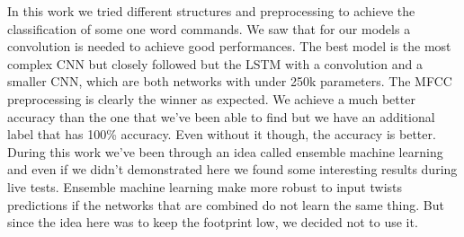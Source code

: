In this work we tried different structures and preprocessing to achieve the classification of some one word commands. We saw that for our models a convolution is needed to achieve good performances. The best model is the most complex CNN but closely followed but the LSTM with a convolution and a smaller CNN, which are both networks with under 250k parameters. The MFCC preprocessing is clearly the winner as expected. We achieve a much better accuracy than the one that we've been able to find but we have an additional label that has 100\% accuracy. Even without it though, the accuracy is better. During this work we've been through an idea called ensemble machine learning and even if we didn't demonstrated here we found some interesting results during live tests. Ensemble machine learning make more robust to input twists predictions if the networks that are combined do not learn the same thing. But since the idea here was to keep the footprint low, we decided not to use it.